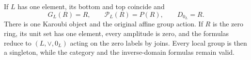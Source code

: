 If $L$ has one element, its bottom and top coincide and
\begin{equation}\tag{SPA28}
G_L(R)=R,\qquad \mathcal P_L(R)=P(R),\qquad D_{0_L}=R.
\end{equation}
There is one Karoubi object and the original affine group
action. If $R$ is the zero ring, its unit set has one
element, every amplitude is zero, and the formulas reduce
to $(L,\vee,0_L)$ acting on the zero labels by joins.
Every local group is then a singleton, while the category
and the inverse-domain formulas remain valid.

